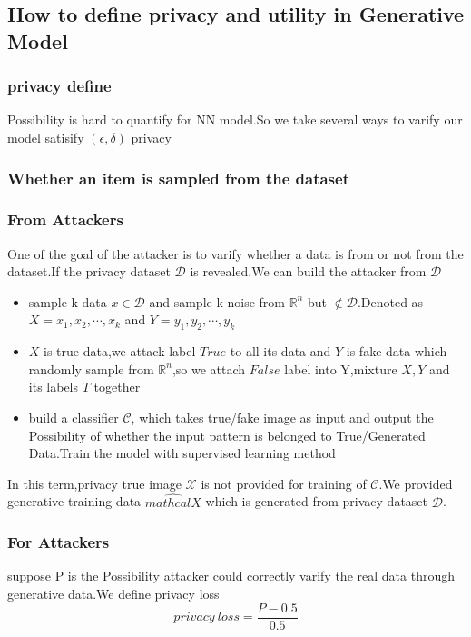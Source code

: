 \documentclass{beamer}
\newcommand{\R}{\mathbb{R}}
\begin{document}
\subsection{How to define privacy and utility in Generative Model}
\begin{frame}
    \frametitle{privacy define}
    Possibility is hard to quantify for NN model.So we take several ways to varify our model satisify $(\epsilon,\delta)$ privacy
\end{frame}
\subsubsection{Whether an item is sampled from the dataset}
\begin{frame}
  \frametitle{From Attackers}
  One of the goal of the attacker is to varify whether a data is from or not from the dataset.If the privacy dataset $\mathcal D$ is revealed.We can build the attacker from $\mathcal D$
  \begin{itemize}
    \item sample k data $x\in \mathcal D$ and sample k noise from $\R^n$ but $\notin \mathcal D$.Denoted as $X = x_1,x_2,\cdots,x_k$ and $Y = y_1,y_2,\cdots,y_k$
    \item $X$ is true data,we attack label $True$ to all its data and $Y$ is fake data which randomly sample from $\R^n$,so we attach $False$ label into Y,mixture $X,Y$ and its labels $T$ together
    \item build a classifier $\mathcal{C}$, which takes true/fake image as input and output the Possibility of whether the input pattern is belonged to True/Generated Data.Train the model with supervised learning method
  \end{itemize}
  In this term,privacy true image $\mathcal{X}$ is not provided for training of $\mathcal{C}$.We provided generative training data $\hat {mathcal{X}}$ which is generated from privacy dataset $\mathcal{D}$.
\end{frame}
\begin{frame}
  \frametitle{For Attackers}
  suppose P is the Possibility attacker could correctly varify the real data through generative data.We define privacy loss
  \begin{equation}
    privacy\ loss = \frac{P-0.5}{0.5}
  \end{equation}
\end{frame}
\end{document}
